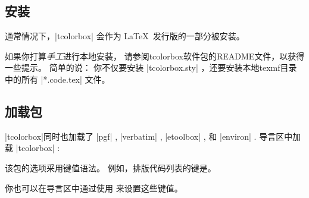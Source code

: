 {%
\subsection{安装}
通常情况下，|tcolorbox| 会作为%
\LaTeX\ 发行版的一部分被安装。%



如果你打算\emph{手工}进行本地安装，%
请参阅tcolorbox软件包的README文件，以获得一些提示。%
简单的说： 你不仅要安装 |tcolorbox.sty| ，还要安装本地texmf目录中的所有 |*.code.tex| 文件。

\subsection{加载包}




|tcolorbox|同时也加载了%
|pgf| ,%
|verbatim| ,%
|etoolbox| ,%
和 |environ| .%
导言区中加载 |tcolorbox| :

\begin{dispListing}
\usepackage{tcolorbox}
\end{dispListing}





该包的选项采用键值语法。%
例如，排版代码列表的键是。

\begin{dispListing}
\usepackage[listings]{tcolorbox}
\end{dispListing}

你也可以在导言区中通过使用  来设置这些键值。%


}
